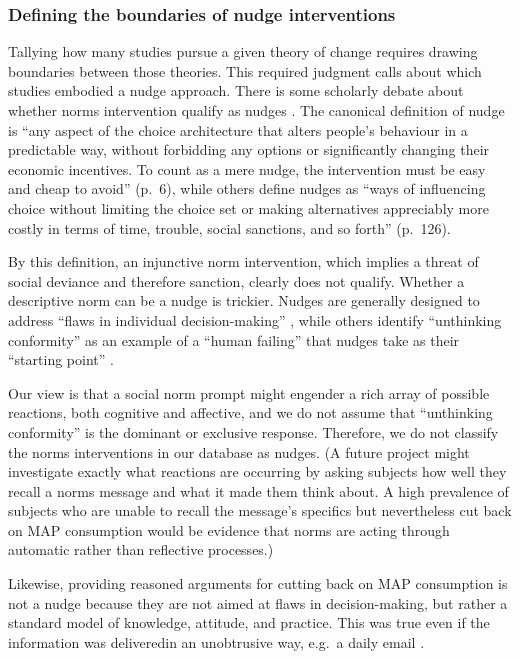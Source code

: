 \documentclass[sn-nature,pdflatex]{sn-jnl}
\begin{document}
\subsubsection{Defining the boundaries of nudge
interventions}\label{defining-the-boundaries-of-nudge-interventions}

Tallying how many studies pursue a given theory of change requires
drawing boundaries between those theories. This required judgment calls
about which studies embodied a nudge approach. There is some scholarly
debate about whether norms intervention qualify as nudges
\citep{bicchieri2023}. The canonical definition of nudge
\citep{thaler2009} is ``any aspect of the choice architecture that
alters people's behaviour in a predictable way, without forbidding any
options or significantly changing their economic incentives. To count as
a mere nudge, the intervention must be easy and cheap to avoid'' (p.~6),
while others \citep{hausman2010} define nudges as ``ways of influencing
choice without limiting the choice set or making alternatives
appreciably more costly in terms of time, trouble, social sanctions, and
so forth'' (p.~126).

By this definition, an injunctive norm intervention, which implies a
threat of social deviance and therefore sanction, clearly does not
qualify. Whether a descriptive norm can be a nudge is trickier. Nudges
are generally designed to address ``flaws in individual
decision-making'' \citep[126]{hausman2010}, while others identify
``unthinking conformity'' as an example of a ``human failing'' that
nudges take as their ``starting point'' \citep[4]{mols2015}.

Our view is that a social norm prompt might engender a rich array of
possible reactions, both cognitive and affective, and we do not assume
that ``unthinking conformity'' is the dominant or exclusive response.
Therefore, we do not classify the norms interventions in our database as
nudges. (A future project might investigate exactly what reactions are
occurring by asking subjects how well they recall a norms message and
what it made them think about. A high prevalence of subjects who are
unable to recall the message's specifics but nevertheless cut back on
MAP consumption would be evidence that norms are acting through
automatic rather than reflective processes.)

Likewise, providing reasoned arguments for cutting back on MAP
consumption is not a nudge because they are not aimed at flaws in
decision-making, but rather a standard model of knowledge, attitude, and
practice. This was true even if the information was deliveredin an
unobtrusive way, e.g.~a daily email \citep{banerjee2019}.
\end{document}
